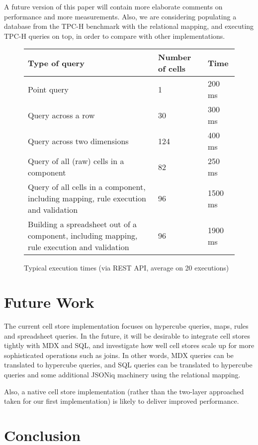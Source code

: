 \documentclass{acm_proc_article-sp}
\begin{document}
A future version of this paper will contain more elaborate comments on performance and more measurements. Also, we are considering populating a database from the TPC-H benchmark with the relational mapping, and executing TPC-H queries on top, in order to compare with other implementations.

\begin{figure*}
\caption{Typical execution times (via REST API, average on 20 executions)}
\label{fig-measurements}
\begin{tabular}{|l|l|l|}
\hline
Type of query & Number of cells & Time \\
\hline
\hline
Point query & 1 & 200 ms \\
\hline
Query across a row&30& 300 ms \\
\hline
Query across two dimensions&124& 400 ms \\
\hline
Query of all (raw) cells in a component &82& 250 ms \\
\hline
Query of all cells in a component, including mapping, rule execution and validation& 96& 1500 ms \\
\hline
Building a spreadsheet out of a component, including mapping, rule execution and validation & 96 & 1900 ms \\
\hline
\end{tabular}
\end{figure*}

\section{Future Work}

The current cell store implementation focuses on hypercube queries, maps, rules and spreadsheet queries. In the future, it will be desirable to integrate cell stores tightly with MDX and SQL, and investigate how well cell stores scale up for more sophisticated operations such as joins. In other words, MDX queries can be translated to hypercube queries, and SQL queries can be translated to hypercube queries and some additional JSONiq machinery using the relational mapping.

Also, a native cell store implementation (rather than the two-layer approached taken for our first implementation) is likely to deliver improved performance.

\section{Conclusion}
\end{document}
